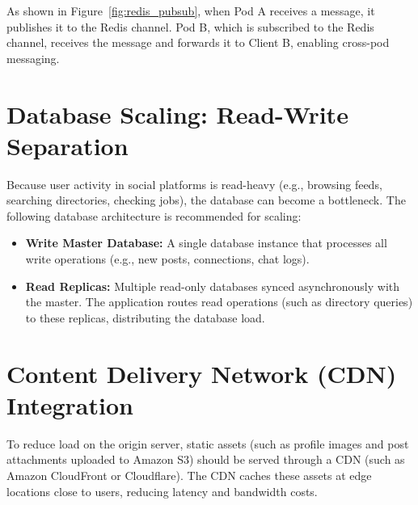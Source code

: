 As shown in Figure~\ref{fig:redis_pubsub}, when Pod A receives a message, it publishes it to the Redis channel. Pod B, which is subscribed to the Redis channel, receives the message and forwards it to Client B, enabling cross-pod messaging.

\section{Database Scaling: Read-Write Separation}
Because user activity in social platforms is read-heavy (e.g., browsing feeds, searching directories, checking jobs), the database can become a bottleneck. The following database architecture is recommended for scaling:
\begin{itemize}
    \item \textbf{Write Master Database:} A single database instance that processes all write operations (e.g., new posts, connections, chat logs).
    \item \textbf{Read Replicas:} Multiple read-only databases synced asynchronously with the master. The application routes read operations (such as directory queries) to these replicas, distributing the database load.
\end{itemize}

\section{Content Delivery Network (CDN) Integration}
To reduce load on the origin server, static assets (such as profile images and post attachments uploaded to Amazon S3) should be served through a CDN (such as Amazon CloudFront or Cloudflare). The CDN caches these assets at edge locations close to users, reducing latency and bandwidth costs.
